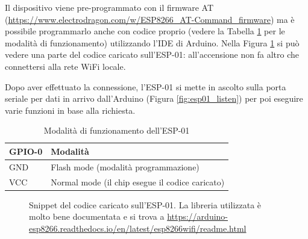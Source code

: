 \documentclass[12pt]{report}
\begin{document}
Il dispositivo viene pre-programmato con il firmware AT  (\url{https://www.electrodragon.com/w/ESP8266\_AT-Command\_firmware}) ma è possibile programmarlo anche con codice proprio (vedere la Tabella \ref{tab:esp01_modes} per le modalità di funzionamento) utilizzando l'IDE di Arduino. Nella Figura \ref{fig:esp01_flashed_code} si può vedere una parte del codice caricato sull'ESP-01: all'accensione non fa altro che connettersi alla rete WiFi locale.

Dopo aver effettuato la connessione, l'ESP-01 si mette in ascolto sulla porta seriale per dati in arrivo dall'Arduino (Figura \ref{fig:esp01_listen}) per poi eseguire varie funzioni in base alla richiesta.


\begin{table}[h!]
	\begin{center}
		\begin{tabular}{l|l} 
			\textbf{GPIO-0} & \textbf{Modalità} \\
			\hline
			GND & Flash mode (modalità programmazione) \\
			VCC & Normal mode (il chip esegue il codice caricato) \\
		\end{tabular}
		\caption{Modalità di funzionamento dell'ESP-01}
		\label{tab:esp01_modes}
	\end{center}
\end{table}

\begin{figure}
	\caption{Snippet del codice caricato sull'ESP-01. La libreria utilizzata è molto bene documentata e si trova a \url{https://arduino-esp8266.readthedocs.io/en/latest/esp8266wifi/readme.html}}
	\label{fig:esp01_flashed_code}
\end{figure}
\end{document}
